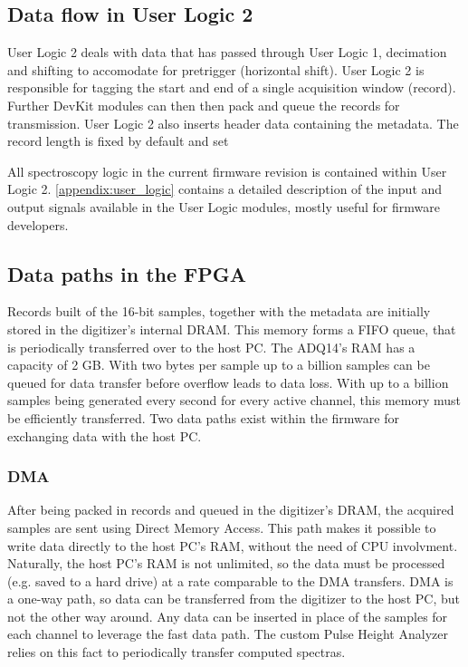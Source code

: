 \documentclass[12pt]{article}
\begin{document}
	\subsection{Data flow in User Logic 2}
		User Logic 2 deals with data that has passed through User Logic 1, decimation and shifting to accomodate
		for pretrigger (horizontal shift). User Logic 2 is responsible for tagging the start and end of a single
		acquisition window (record). Further DevKit modules can then then pack and queue the records for transmission.
		User Logic 2 also inserts header data containing the metadata. The record length is fixed by default and set
		\par
		All spectroscopy logic in the current firmware revision is contained within User Logic 2. 
		\autoref{appendix:user_logic} contains a detailed description of the input and output signals 
		available in the User Logic modules, mostly useful for firmware developers.
	\subsection{Data paths in the FPGA}
		Records built of the 16-bit samples, together with the metadata are initially stored in the digitizer's
		internal DRAM. This memory forms a FIFO queue, that is periodically transferred over to the host PC. The 
		ADQ14's RAM has a capacity of 2 GB. With two bytes per sample up to a billion samples can be queued
		for data transfer before overflow leads to data loss. With up to a billion samples being generated
		every second for every active channel, this memory must be efficiently transferred.
		Two data paths exist within the firmware for exchanging data with the host PC.
		\subsubsection{DMA}
		After being packed in records and queued in the digitizer's DRAM, the acquired samples are sent
		using Direct Memory Access. This path makes it possible to write data directly to the host PC's RAM, 
		without the need of CPU involvment. Naturally, the host PC's RAM is not unlimited, 
		so the data must be processed (e.g. saved to a hard drive) at a rate comparable to the DMA transfers.
		DMA is a one-way path, so data can be transferred from the digitizer to the host PC,
		but not the other way around.
		Any data can be inserted in place of the samples for each channel to leverage the fast data path. 
		The custom Pulse Height Analyzer relies on this fact to periodically transfer computed spectras.
\end{document}
